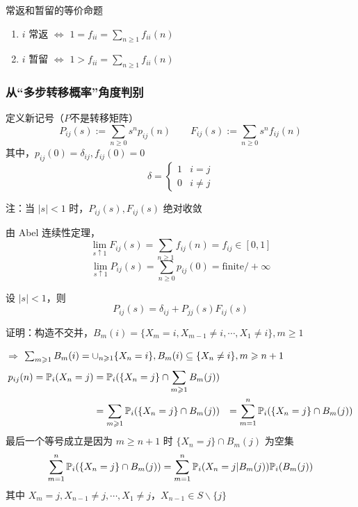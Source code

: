 \begin{proposition}
    常返和暂留的等价命题
    \begin{enumerate}
        \item $i$ 常返 $\Leftrightarrow$ $1=f_{ii}=\sum_{n\geq 1}f_{ii}(n)$
        \item $i$ 暂留 $\Leftrightarrow$ $1>f_{ii}=\sum_{n\geq 1}f_{ii}(n)$
    \end{enumerate}
\end{proposition}

\subsubsection{从“多步转移概率”角度判别}

定义新记号（$P$不是转移矩阵）
\[
P_{ij}(s):=\sum_{n\geq 0}s^n p_{ij}(n)\qquad F_{ij}(s):=\sum_{n\geq 0}s^n f_{ij}(n)
\]
其中，$p_{ij}(0)=\delta_{ij},f_{ij}(0)=0$
\[
\delta=\begin{cases}
    1 & i=j\\
    0 & i\neq j
\end{cases}
\]

注：当 $|s|<1$ 时，$P_{ij}(s),F_{ij}(s)$ 绝对收敛

由 Abel 连续性定理，
\[
\lim_{s\uparrow 1}F_{ij}(s)=\sum_{n\geq 1}f_{ij}(n)=f_{ij}\in [0,1]
\]
\[
\lim_{s\uparrow 1}P_{ij}(s)=\sum_{n\geq 0}p_{ij}(0)=\text{finite}/+\infty
\]
\begin{lemma}
     设 $|s|<1$，则
    \[
    P_{ij}(s)=\delta_{ij}+P_{jj}(s)F_{ij}(s)
    \]
\end{lemma}

证明：构造不交并，$B_m(i)=\{X_m=i,X_{m-1}\neq i,\cdots,X_1\neq i\}, m\geq 1$

$\Rightarrow$ $\sum_{m\geqslant 1}B_m(i)=\cup_{n\geqslant 1}\{X_n=i\}, B_m(i)\subseteq \{X_n\neq i\}, m\geqslant n+1$
\[
\begin{aligned}
    p_{ij}(n)=\mathbb{P}_i(X_n=j)&=\mathbb{P}_i(\{X_n=j\}\cap \sum_{m\geqslant 1}B_m(j))\\
    &=\sum_{m\geqslant 1}\mathbb{P}_i(\{X_n=j\}\cap B_m(j))
    &=\sum_{m=1}^n\mathbb{P}_i(\{X_n=j\}\cap B_m(j))
\end{aligned}
\]
最后一个等号成立是因为 $m\geq n+1$ 时 $\{X_n=j\}\cap B_m(j)$ 为空集
\[
\sum_{m=1}^n\mathbb{P}_i(\{X_n=j\}\cap B_m(j))=\sum_{m=1}^n\mathbb{P}_i(X_n=j|B_m(j))\mathbb{P}_i(B_m(j))
\]
其中 $X_m=j,X_{n-1}\neq j,\cdots,X_1\neq j$，$X_{n-1}\in S\backslash \{j\}$

